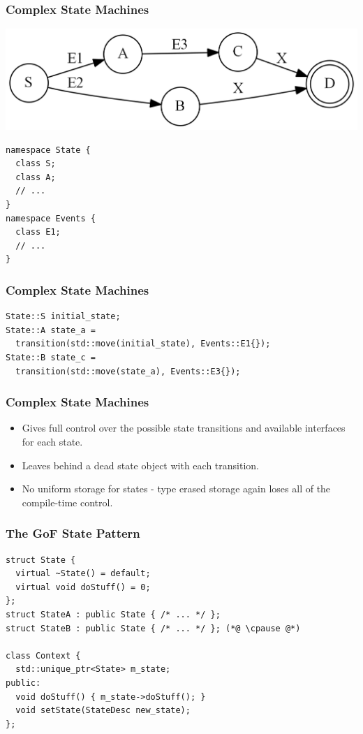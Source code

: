 \documentclass[aspectratio=169]{beamer}
\newif\iftransitions
\newcommand{\cpause}{\iftransitions \pause \fi}
\begin{document}
\begin{frame}[fragile]
  \frametitle{Complex State Machines}
  
  \begin{center}
  \includegraphics[width=.4\textwidth]{ifgfx/state_machine.png}
  \end{center}
  
  \begin{lstlisting}[style=cpp20]
namespace State {
  class S;
  class A;
  // ...
}
namespace Events {
  class E1;
  // ...
}
  \end{lstlisting}
\end{frame}

\begin{frame}[fragile]
  \frametitle{Complex State Machines}
  
  \begin{lstlisting}[style=cpp20]
State::S initial_state;
State::A state_a =
  transition(std::move(initial_state), Events::E1{});
State::B state_c =
  transition(std::move(state_a), Events::E3{});
  \end{lstlisting}
\end{frame}

\begin{frame}[fragile]
  \frametitle{Complex State Machines}
  
  \begin{itemize}
  \item Gives full control over the possible state transitions and available interfaces for each state.
  \item Leaves behind a dead state object with each transition.
  \item No uniform storage for states - type erased storage again loses all of the compile-time control.
  \end{itemize}
\end{frame}

\begin{frame}[fragile]
  \frametitle{The GoF State Pattern}
  
  \begin{lstlisting}[style=cpp20]
struct State {
  virtual ~State() = default;
  virtual void doStuff() = 0;
};
struct StateA : public State { /* ... */ };
struct StateB : public State { /* ... */ }; (*@ \cpause @*)

class Context {
  std::unique_ptr<State> m_state;
public:
  void doStuff() { m_state->doStuff(); }
  void setState(StateDesc new_state);
};
  \end{lstlisting}
\end{frame}
\end{document}
